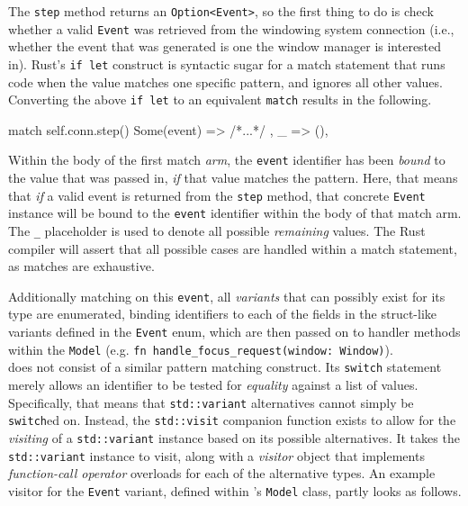 The  \texttt{step} method  returns an  \texttt{Option<Event>}, so  the
first thing to do is check whether a valid \texttt{Event} was retrieved from the
windowing system connection  (i.e., whether the event that was  generated is one
the window manager is interested in). Rust's \texttt{if let} construct
is syntactic sugar for  a match statement that runs code  when the value matches
one specific pattern, and ignores all other values\cite{therustbook}. Converting
the above  \texttt{if let}  to an  equivalent \texttt{match}
results in the following.

\begin{rustblock}
  match self.conn.step() {
    Some(event) => { /*...*/ },
    _ => (),
  }
\end{rustblock}

Within the body  of the first match \textit{arm},  the \texttt{event} identifier
has been \textit{bound} to the value  that was passed in, \textit{if} that value
matches the pattern\cite{therustbook}. Here, that means that \textit{if} a valid
event is  returned from the  \texttt{step} method, that  concrete \texttt{Event}
instance  will be  bound to  the \texttt{event}  identifier within  the body  of
that  match arm.  The \texttt{\_}  placeholder is  used to  denote all  possible
\textit{remaining} values\cite{therustbook}. The Rust  compiler will assert that
all  possible  cases are  handled  within  a  match  statement, as  matches  are
exhaustive\cite{therustbook}.

Additionally  matching on  this \texttt{event},  all \textit{variants}  that can
possibly  exist for  its type  are enumerated,  binding identifiers  to each  of
the  fields in  the struct-like  variants  defined in  the \texttt{Event}  enum,
which are  then passed  on to  handler methods  within the  \texttt{Model} (e.g.
\texttt{fn handle_focus_request(window: Window)}).\\


\cpp  does   not  consist   of  a  similar   pattern  matching   construct.  Its
\texttt{switch}   statement  merely   allows   an   identifier  to   be
tested   for  \textit{equality}   against  a   list  of   values.  Specifically,
that  means  that   \texttt{std::variant}  alternatives  cannot  simply
be  \texttt{switch}ed  on.  Instead,  the  \texttt{std::visit}
companion  function   exists  to   allow  for   the  \textit{visiting}\cite{go4}
of   a   \texttt{std::variant}   instance   based   on   its   possible
alternatives\cite{cppstd}.    It   takes    the   \texttt{std::variant}
instance  to  visit,  along  with  a  \textit{visitor}  object  that  implements
\textit{function-call  operator} overloads  for each  of the  alternative types.
An  example visitor  for  the \texttt{Event}  variant,  defined within  \wmcpp's
\texttt{Model} class, partly looks as follows.

